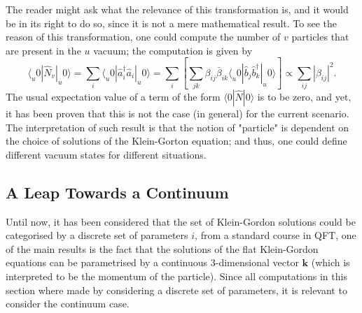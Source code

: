 The reader might ask what the relevance of this transformation is, and it would be in its right to do so, since it is not a mere mathematical result. To see the reason of this transformation, one could compute the number of $v$ particles that are present in the $u$ vacuum; the computation is given by
\begin{equation}
	\langle_u0|\hat{N}_v|_u0\rangle=\sum_i\langle_u0|\hat{a}_i^\dagger\hat{a}_i|_u0\rangle=\sum_{i}\left[\sum_{jk}\beta_{ij}\bar \beta_{ik}\langle_u0|\hat{b}_j\hat{b}_k^\dagger|_u0\rangle\right]\propto \sum_{ij}|\beta_{ij}|^2.
\end{equation}
The usual expectation value of a term of the form $\langle0|\hat{N}|0\rangle$ is to be zero, and yet, it has been proven that this is not the case (in general) for the current scenario. The interpretation of such result is that the notion of "particle" is dependent on the choice of solutions of the Klein-Gorton equation; and thus, one could define different vacuum states for different situations.

\subsection{A Leap Towards a Continuum}
Until now, it has been considered that the set of Klein-Gordon solutions could be categorised by a discrete set of parameters $i$, from a standard course in QFT, one of the main results is the fact that the solutions of the flat Klein-Gordon equations can be parametrised by a continuous $3$-dimensional vector $\mathbf{k}$ (which is interpreted to be the momentum of the particle). Since all computations in this section where made by considering a discrete set of parameters, it is relevant to consider the continuum case.

